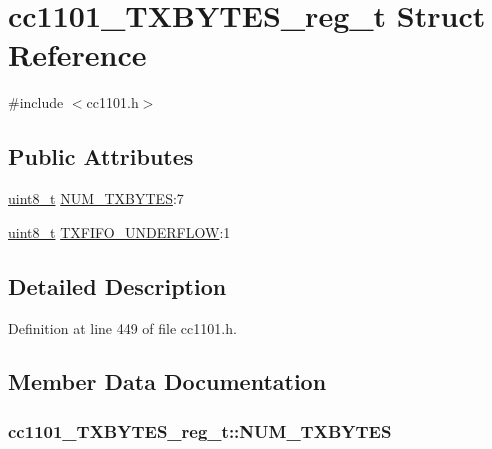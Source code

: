 \hypertarget{structcc1101___t_x_b_y_t_e_s__reg__t}{}\section{cc1101\+\_\+\+T\+X\+B\+Y\+T\+E\+S\+\_\+reg\+\_\+t Struct Reference}
\label{structcc1101___t_x_b_y_t_e_s__reg__t}


{\ttfamily \#include $<$cc1101.\+h$>$}

\subsection*{Public Attributes}
\begin{DoxyCompactItemize}
\item 
\hyperlink{_p_e___types_8h_aba7bc1797add20fe3efdf37ced1182c5}{uint8\+\_\+t} \hyperlink{structcc1101___t_x_b_y_t_e_s__reg__t_a74df9fe0bad9f7c7a6056c25e4933f18}{N\+U\+M\+\_\+\+T\+X\+B\+Y\+T\+ES}\+:7
\item 
\hyperlink{_p_e___types_8h_aba7bc1797add20fe3efdf37ced1182c5}{uint8\+\_\+t} \hyperlink{structcc1101___t_x_b_y_t_e_s__reg__t_a0e60707195aa9b1c9d1e3fb472c4e6ed}{T\+X\+F\+I\+F\+O\+\_\+\+U\+N\+D\+E\+R\+F\+L\+OW}\+:1
\end{DoxyCompactItemize}


\subsection{Detailed Description}


Definition at line 449 of file cc1101.\+h.



\subsection{Member Data Documentation}
\subsubsection[{\texorpdfstring{N\+U\+M\+\_\+\+T\+X\+B\+Y\+T\+ES}{NUM_TXBYTES}}]{ cc1101\+\_\+\+T\+X\+B\+Y\+T\+E\+S\+\_\+reg\+\_\+t\+::\+N\+U\+M\+\_\+\+T\+X\+B\+Y\+T\+ES}\hypertarget{structcc1101___t_x_b_y_t_e_s__reg__t_a74df9fe0bad9f7c7a6056c25e4933f18}{}\label{structcc1101___t_x_b_y_t_e_s__reg__t_a74df9fe0bad9f7c7a6056c25e4933f18}


